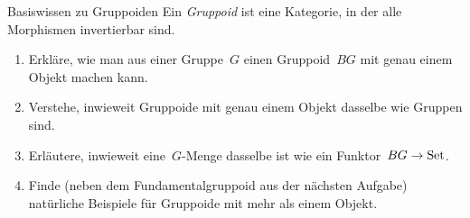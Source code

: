 \documentclass{uebblatt}
\begin{document}

\begin{aufgabe}{Basiswissen zu Gruppoiden}
Ein \emph{Gruppoid} ist eine Kategorie, in der alle Morphismen invertierbar
sind.
\begin{enumerate}
\item Erkläre, wie man aus einer Gruppe~$G$ einen Gruppoid~$BG$ mit genau einem Objekt
machen kann.
\item Verstehe, inwieweit Gruppoide mit genau einem Objekt dasselbe wie Gruppen
sind.
\item Erläutere, inwieweit eine~$G$-Menge dasselbe ist wie ein Funktor~$BG \to
\mathrm{Set}$.
\item Finde (neben dem Fundamentalgruppoid aus der nächsten Aufgabe) natürliche
Beispiele für Gruppoide mit mehr als einem Objekt.
\end{enumerate}
\end{aufgabe}
\end{document}
